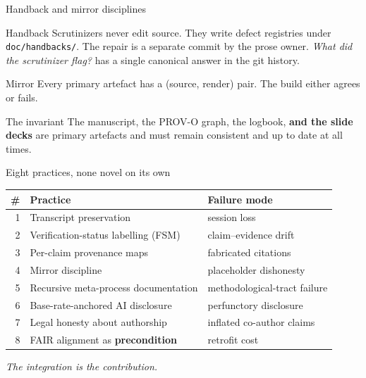 \documentclass[aspectratio=169,11pt]{beamer}
\begin{document}
\begin{frame}{Handback and mirror disciplines}
  \begin{block}{Handback}
    Scrutinizers never edit source. They write defect registries under
    \texttt{doc/handbacks/}. The repair is a separate commit by the prose
    owner. \emph{What did the scrutinizer flag?} has a single canonical
    answer in the git history.
  \end{block}

  \begin{block}{Mirror}
    Every primary artefact has a (source, render) pair. The build either
    agrees or fails.
  \end{block}

  \begin{block}{The invariant}
    The manuscript, the PROV-O graph, the logbook, \textbf{and the slide decks}
    are primary artefacts and must remain consistent and up to date at all times.
  \end{block}
\end{frame}


\begin{frame}{Eight practices, none novel on its own}
  \footnotesize
  \begin{tabular}{rlp{5.0cm}}
    \toprule
    \# & Practice & Failure mode \\
    \midrule
    1 & Transcript preservation              & session loss \\
    2 & Verification-status labelling (FSM)  & claim--evidence drift \\
    3 & Per-claim provenance maps            & fabricated citations \\
    4 & Mirror discipline                    & placeholder dishonesty \\
    5 & Recursive meta-process documentation & methodological-tract failure \\
    6 & Base-rate-anchored AI disclosure     & perfunctory disclosure \\
    7 & Legal honesty about authorship       & inflated co-author claims \\
    8 & FAIR alignment as \textbf{precondition} & retrofit cost \\
    \bottomrule
  \end{tabular}

  \vspace{0.6em}
  \normalsize
  \textit{The integration is the contribution.}
\end{frame}
\end{document}
